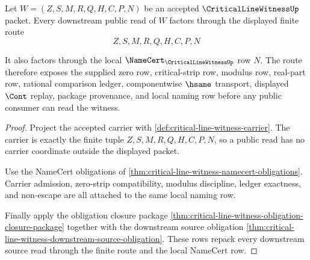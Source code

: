 \begin{theorem}
\label{thm:critical-line-witness-root-public-readiness}
Let $W=(Z,S,M,R,Q,H,C,P,N)$ be an accepted $\CriticalLineWitnessUp$ packet.
Every downstream public read of $W$ factors through the displayed finite route
$$
Z,S,M,R,Q,H,C,P,N
$$

It also factors through the local $\NameCert_{\CriticalLineWitnessUp}$ row $N$.
The route therefore exposes the supplied zero row, critical-strip row, modulus
row, real-part row, rational comparison ledger, componentwise $\hsame$
transport, displayed $\Cont$ replay, package provenance, and local naming row
before any public consumer can read the witness.
\end{theorem}
\begin{proof}
Project the accepted carrier with \autoref{def:critical-line-witness-carrier}.
The carrier is exactly the finite tuple $Z,S,M,R,Q,H,C,P,N$, so a public read
has no carrier coordinate outside the displayed packet.

Use the NameCert obligations of
\autoref{thm:critical-line-witness-namecert-obligations}. Carrier admission,
zero-strip compatibility, modulus discipline, ledger exactness, and non-escape
are all attached to the same local naming row.

Finally apply the obligation closure package
\autoref{thm:critical-line-witness-obligation-closure-package} together with
the downstream source obligation
\autoref{thm:critical-line-witness-downstream-source-obligation}. These rows
repack every downstream source read through the finite route and the local
NameCert row.
\end{proof}

